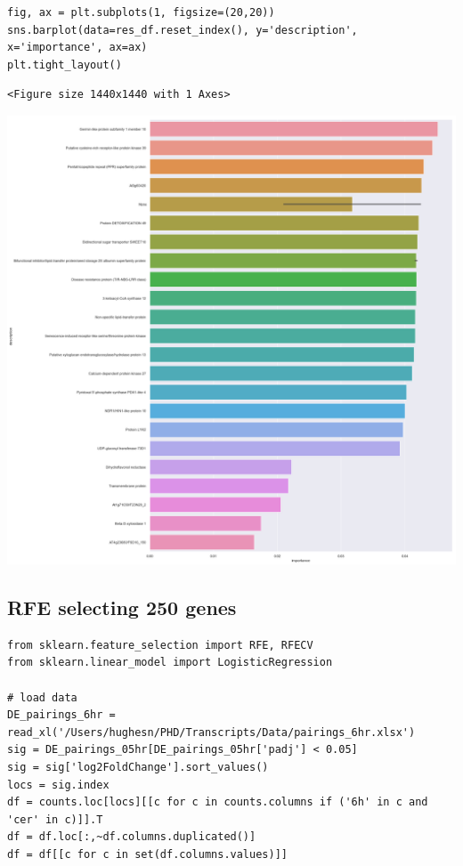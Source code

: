 \documentclass[11pt]{article}
\begin{document}
\begin{verbatim}
fig, ax = plt.subplots(1, figsize=(20,20))
sns.barplot(data=res_df.reset_index(), y='description', x='importance', ax=ax)
plt.tight_layout()
\end{verbatim}

\begin{verbatim}
<Figure size 1440x1440 with 1 Axes>
\end{verbatim}


\begin{center}
\includegraphics[width=.9\linewidth]{obipy-resources/93e2fbf76ed477962282ae99767b8408de4d3ed9/823bb9a59b4378bbd61f075dc9aba91fb69f829f.png}
\end{center}


\subsection{RFE selecting 250 genes}
\label{sec:org7a27be5}
\begin{verbatim}
from sklearn.feature_selection import RFE, RFECV
from sklearn.linear_model import LogisticRegression

# load data
DE_pairings_6hr = read_xl('/Users/hughesn/PHD/Transcripts/Data/pairings_6hr.xlsx')
sig = DE_pairings_05hr[DE_pairings_05hr['padj'] < 0.05]
sig = sig['log2FoldChange'].sort_values()
locs = sig.index
df = counts.loc[locs][[c for c in counts.columns if ('6h' in c and 'cer' in c)]].T
df = df.loc[:,~df.columns.duplicated()]
df = df[[c for c in set(df.columns.values)]]
\end{verbatim}
\end{document}
